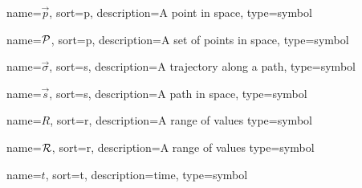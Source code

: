 	{%
		name={\ensuremath{\vec{p}}},
		sort=p,
		description=A point in space,
		type=symbol
	}
	\newcommand{\point}{\gls{sym:point}}

	{%
		name={\ensuremath{\set{P}}},
		sort=p,
		description=A set of points in space,
		type=symbol
	}
	\newcommand{\setofpoints}{\gls{sym:setofpoints}}

	{%
		name={\ensuremath{\vec{\sigma}}},
		sort=s,
		description=A trajectory along a path,
		type=symbol
	}
	\newcommand{\traj}{\gls{sym:traj}}

	{%
		name={\ensuremath{\vec{s}}},
		sort=s,
		description=A path in space,
		type=symbol
	}
	\newcommand{\pathsym}{\gls{sym:pathsym}}

	{%
		name={\ensuremath{R}},
		sort=r,
		description=A range of values
		type=symbol
	}
	\newcommand{\range}{\gls{sym:range}}
	\newcommand{\rangetimenorm}{\ensuremath{\range_{\timenorm}}}

	{%
		name={\ensuremath{\set{R}}},
		sort=r,
		description=A range of values
		type=symbol
	}
	\newcommand{\setofranges}{\gls{sym:setofranges}}
	\newcommand{\setofrangestimenorm}{\ensuremath{\setofranges_{\timenorm}}}


	{%
		name={\ensuremath{t}},
		sort=t,
		description=time,
		type=symbol
	}
	\newcommand{\timesym}{\gls{sym:time}}

